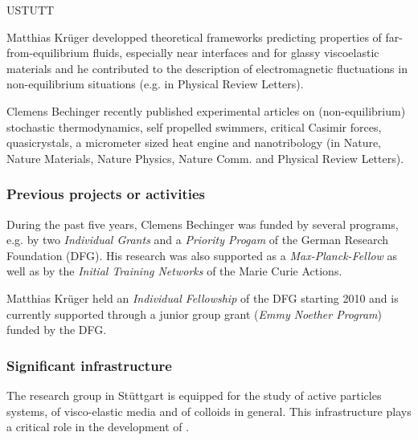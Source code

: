 \begin{sitedescription}{USTUTT}
\begin{compactenum}
\item Matthias Krüger developped theoretical frameworks predicting properties of
far-from-equilibrium fluids, especially near interfaces and for glassy viscoelastic
materials and he contributed to the description of electromagnetic fluctuations in
non-equilibrium situations (e.g. in Physical Review Letters).
\item Clemens Bechinger recently published experimental articles on (non-equilibrium)
stochastic thermodynamics, self propelled swimmers, critical Casimir forces, quasicrystals,
a micrometer sized heat engine and nanotribology (in Nature, Nature Materials, Nature
Physics, Nature Comm. and Physical Review Letters).
\end{compactenum}

\subsubsection*{Previous projects or activities}

\begin{compactenum}
\item During the past five years, Clemens Bechinger was funded by several programs, e.g. by
two {\it Individual Grants} and a {\it Priority Progam} of the German Research Foundation
(DFG). His research was also supported as a {\it Max-Planck-Fellow} as well as by the {\it
  Initial Training Networks} of the Marie Curie Actions.
\item Matthias Krüger held an {\it Individual Fellowship} of the DFG starting 2010 and is
currently supported through a junior group grant ({\it Emmy Noether Program}) funded by the
DFG.
\end{compactenum}

\subsubsection*{Significant infrastructure}
The research group in Stüttgart is equipped for the study of active particles systems, of
visco-elastic media and of colloids in general.
%
This infrastructure plays a critical role in the development of \TheProject.

\end{sitedescription}

